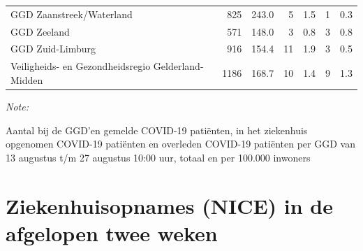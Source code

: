 \documentclass[
  english,
  man,floatsintext]{apa6}
\begin{document}
\begin{table}
\begin{threeparttable}
\begin{tabular}{lrrrrrr}
GGD Zaanstreek/Waterland & 825 & 243.0 & 5 & 1.5 & 1 & 0.3\\
GGD Zeeland & 571 & 148.0 & 3 & 0.8 & 3 & 0.8\\
GGD Zuid-Limburg & 916 & 154.4 & 11 & 1.9 & 3 & 0.5\\
Veiligheids- en Gezondheidsregio Gelderland-Midden & 1186 & 168.7 & 10 & 1.4 & 9 & 1.3\\
\bottomrule
\end{tabular}
\begin{tablenotes}
\item \textit{Note: } 
\item Aantal bij de GGD’en gemelde COVID-19 patiënten, in het ziekenhuis opgenomen COVID-19 patiënten en overleden COVID-19 patiënten per GGD van 13 augustus t/m 27 augustus 10:00 uur, totaal en per 100.000 inwoners
\end{tablenotes}
\end{threeparttable}
\endgroup{}
\end{table}

\newpage

\hypertarget{ziekenhuisopnames-nice-in-de-afgelopen-twee-weken}{%
\section{Ziekenhuisopnames (NICE) in de afgelopen twee weken}\label{ziekenhuisopnames-nice-in-de-afgelopen-twee-weken}}
\end{document}
